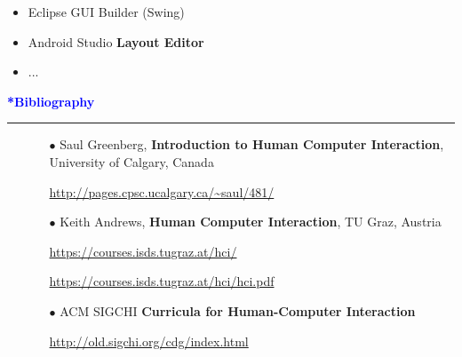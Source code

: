 \documentclass[pdf]{beamer}
\begin{document}
{{{{{{{{\begin{frame}
\begin{itemize}
\item Eclipse GUI Builder (Swing)

\item  Android Studio \textbf{Layout Editor}

\item ...

\end{itemize}

\end{frame}}




{
\begin{frame}
	\vspace{8mm}
	\textcolor{Blue}{\textbf{\Large{*Bibliography}}}
    \textcolor{red}{\rule{10cm}{1mm}}

    \begin{itemize}
    	\item[] 
        \begin{itemize}
        	\item[{$\bullet$}] Saul Greenberg, \textbf{Introduction to Human Computer Interaction}, University of Calgary, Canada

        	\url{http://pages.cpsc.ucalgary.ca/~saul/481/}
        	
        	\item[{$\bullet$}] Keith Andrews, \textbf{Human Computer Interaction}, TU Graz, Austria

        	\url{https://courses.isds.tugraz.at/hci/}

        	\url{https://courses.isds.tugraz.at/hci/hci.pdf}
        	
        	\item[{$\bullet$}] ACM SIGCHI \textbf{Curricula for Human-Computer Interaction}
        	
        	\url{http://old.sigchi.org/cdg/index.html}
     	\end{itemize}
   	\end{itemize}

\end{frame}}



}}}}}}}
\end{document}
